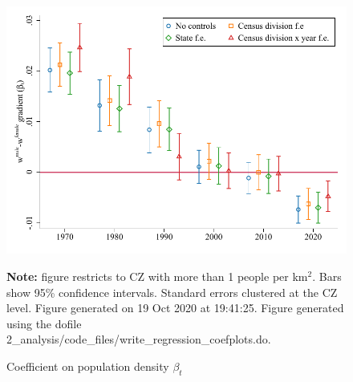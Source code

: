 \begin{figure}[!h]
\centering
\caption{Coefficient on population density $ \beta_t $}
\includegraphics[width=.6\textwidth]{../2_analysis/output/figures/baseline_gradients_l_czone_density_full_time}
\par \begin{minipage}[h]{\textwidth}{\tiny\textbf{Note:} figure restricts to CZ with more than 1 people per km$^2$. Bars show 95\% confidence intervals. Standard errors clustered at the CZ level. Figure generated on 19 Oct 2020 at 19:41:25. Figure generated using the dofile 2\_analysis/code\_files/write\_regression\_coefplots.do.}\end{minipage}
\end{figure}

